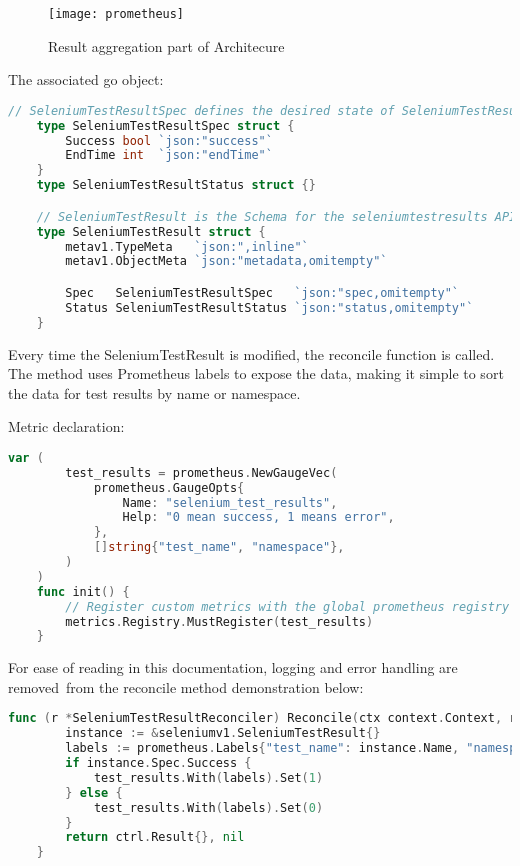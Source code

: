 \begin{figure}[H]
	\centering
	\texttt{[image: prometheus]}
	\label{fig:prometheus}
	\caption{Result aggregation part of Architecure}
\end{figure}

The associated go object:
\begin{lstlisting}[language={Go}]
	// SeleniumTestResultSpec defines the desired state of SeleniumTestResult
	type SeleniumTestResultSpec struct {
		Success bool `json:"success"`
		EndTime int  `json:"endTime"`
	}
	type SeleniumTestResultStatus struct {}

	// SeleniumTestResult is the Schema for the seleniumtestresults API
	type SeleniumTestResult struct {
		metav1.TypeMeta   `json:",inline"`
		metav1.ObjectMeta `json:"metadata,omitempty"`

		Spec   SeleniumTestResultSpec   `json:"spec,omitempty"`
		Status SeleniumTestResultStatus `json:"status,omitempty"`
	}
\end{lstlisting}

Every time the SeleniumTestResult is modified, the reconcile function is called. The method uses Prometheus labels to expose the data, making it simple to sort the data for test results by name or namespace.

Metric declaration:

\begin{lstlisting}[language={Go}]
	var (
		test_results = prometheus.NewGaugeVec(
			prometheus.GaugeOpts{
				Name: "selenium_test_results",
				Help: "0 mean success, 1 means error",
			},
			[]string{"test_name", "namespace"},
		)
	)
	func init() {
		// Register custom metrics with the global prometheus registry
		metrics.Registry.MustRegister(test_results)
	}
\end{lstlisting}

For ease of reading in this documentation, logging and error handling are removed from the reconcile method demonstration below:

\begin{lstlisting}[language={Go}]
	func (r *SeleniumTestResultReconciler) Reconcile(ctx context.Context, req ctrl.Request) (ctrl.Result, error) {
		instance := &seleniumv1.SeleniumTestResult{}
		labels := prometheus.Labels{"test_name": instance.Name, "namespace": instance.Namespace}
		if instance.Spec.Success {
			test_results.With(labels).Set(1)
		} else {
			test_results.With(labels).Set(0)
		}
		return ctrl.Result{}, nil
	}
\end{lstlisting}

